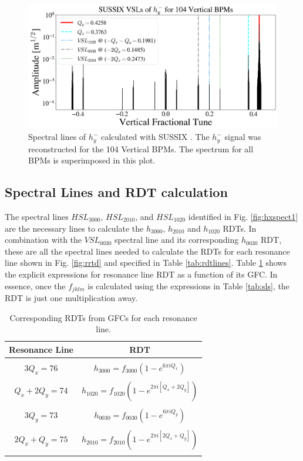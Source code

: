 \begin{figure}[H]
    \centering
    \includegraphics[width=\columnwidth]{chapter4/hyspect.png}
    \caption{Spectral lines of $h_y^{-}$ calculated with SUSSIX \cite{sussix}. The $h_y^{-}$ signal was reconstructed for the 104 Vertical BPMs. The spectrum for all BPMs is superimposed in this plot.}
    \label{fig:hyspect1}
\end{figure}

\subsection{Spectral Lines and RDT calculation}

The spectral lines $HSL_{3000}$, $HSL_{2010}$, and $HSL_{1020}$ identified in Fig. \ref{fig:hxspect1} are the necessary lines to calculate the $h_{3000}$, $h_{2010}$ and $h_{1020}$ RDTs. In combination with the $VSL_{0030}$ spectral line and its corresponding $h_{0030}$ RDT, these are all the spectral lines needed to calculate the RDTs for each resonance line shown in Fig. \ref{fig:rrtd} and specified in Table \ref{tab:rdtlines}. Table \ref{tab:rdts2} shows the explicit expressions for resonance line RDT as a function of its GFC. In essence, once the $f_{jklm}$ is calculated using the expressions in Table \ref{tab:sls}, the RDT is just one multiplication away.

\begin{table}[H]
    \centering
    \caption{Corresponding RDTs from GFCs for each resonance line.}
    \label{tab:rdts2}
    \begin{tabular}{cc}
    \textbf{Resonance Line} & \textbf{RDT} \\ \hline
     &  \\
    $3Q_x=76$ & $h_{3000}= f_{3000}\left( 1-e^{6\pi i  Q_x  } \right)$ \\
     &  \\
    $Q_x+2Q_y=74$ & $h_{1020}=f_{1020} \left( 1-e^{2\pi i \left[Q_x + 2 Q_y \right] }\right) $ \\
     &  \\
    $3Q_y=73$ & $h_{0030}= f_{0030}\left( 1-e^{6\pi i  Q_y  } \right)$ \\
     &  \\
    $2Q_x+Q_y=75$ & $h_{2010}=f_{2010} \left( 1-e^{2\pi i \left[2Q_x + Q_y \right] }\right) $ \\
     &  \\ \hline
    \end{tabular}
\end{table}

